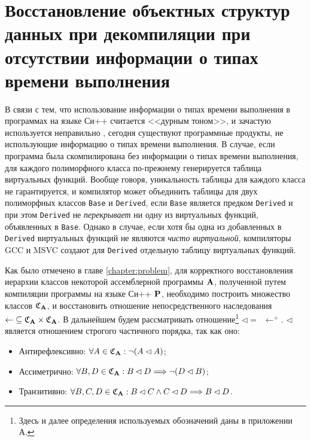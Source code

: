 \newpage
\section{Восстановление объектных структур данных при декомпиляции при отсутствии информации о типах времени выполнения}\label{chapter:reconstruction_without_rtti}
В связи с тем, что использование информации о типах времени выполнения в программах на языке Си++ считается <<дурным тоном>>, и зачастую используется неправильно \cite{stroustrup93}, сегодня существуют программные продукты, не использующие информацию о типах времени выполнения. В случае, если программа была скомпилирована без информации о типах времени выполнения, для каждого полиморфного класса по-прежнему генерируется таблица виртуальных функций. Вообще говоря, уникальность таблицы для каждого класса не гарантируется, и компилятор может объединить таблицы для двух полиморфных классов \lstinline{Base} и \lstinline{Derived}, если \lstinline{Base} является предком \lstinline{Derived} и при этом \lstinline{Derived} не {\it перекрывает} ни одну из виртуальных функций, объявленных в \lstinline{Base}. Однако в случае, если хотя бы одна из добавленных в \lstinline{Derived} виртуальных функций не являются {\it чисто виртуальной}, компиляторы GCC и MSVC создают для \lstinline{Derived} отдельную таблицу виртуальных функций. 

Как было отмечено в главе \ref{chapter:problem}, для корректного восстановления иерархии классов некоторой ассемблерной программы $\mathbf{A}$, полученной путем компиляции программы на языке Си++ $\mathbf{P}$, необходимо построить множество классов $\mathfrak{C}_{\mathbf{A}}$, и восстановить отношение непосредственного наследования $\leftarrow \; \subseteq \mathfrak{C}_{\mathbf{A}} \times \mathfrak{C}_{\mathbf{A}}$. В дальнейшем будем рассматривать отношение\footnote{Здесь и далее определения используемых обозначений даны в приложении А.} $\lhd = \enspace \leftarrow^+$. $\lhd$ является отношением строгого частичного порядка, так как оно:
\begin{itemize}
\item Антирефлексивно: $\forall A \in \mathfrak{C}_{\mathbf{A}}: \neg (A \lhd A)$;
\item Ассиметрично: $\forall B, D \in \mathfrak{C}_{\mathbf{A}}: B \lhd D \Longrightarrow \neg (D \lhd B)$;
\item Транзитивно: $\forall B, C, D \in \mathfrak{C}_{\mathbf{A}}: B \lhd C \wedge C \lhd D \Longrightarrow B \lhd D$.
\end{itemize}

